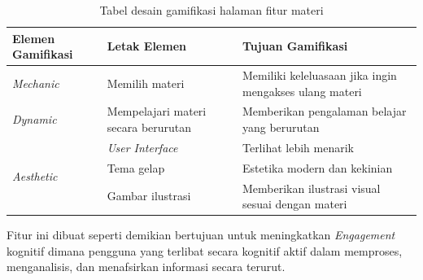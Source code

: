 \begin{table}[H]
	\caption{Tabel desain gamifikasi halaman fitur materi}
	\label{TabelGameMateri}
	\begin{tabular}{|m{3.6cm}|m{}|m{}|}
		\hline
		Elemen Gamifikasi& Letak Elemen & Tujuan Gamifikasi\\
		\hline
		\textit{Mechanic}&Memilih materi& Memiliki keleluasaan jika ingin mengakses ulang materi\\
		\hline
		\textit{Dynamic}&Mempelajari materi secara berurutan&Memberikan pengalaman belajar yang berurutan \\
		\hline
		\multirow{3}{1cm}{\textit{Aesthetic}}&\textit{User Interface}&Terlihat lebih menarik\\
		\cline{2-3}
		& Tema gelap & Estetika modern dan kekinian \\
		\cline{2-3}
		&Gambar ilustrasi& Memberikan ilustrasi visual sesuai dengan materi\\
		\hline
	\end{tabular}
\end{table}
Fitur ini dibuat seperti demikian bertujuan untuk meningkatkan \textit{Engagement} kognitif dimana pengguna yang terlibat secara kognitif aktif dalam memproses, menganalisis, dan menafsirkan informasi secara terurut.
